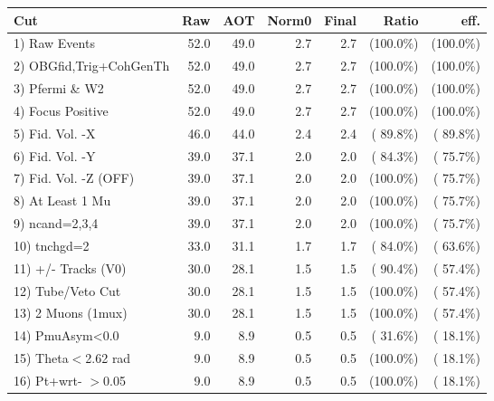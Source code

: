  \begin{table}[h!]\centering
 \begin{tabular}{||l||r|r|r|r|r|r||}
 \hline
 \hline
 Cut & Raw & AOT & Norm0 & Final & Ratio & eff.       \\
 \hline
  1) Raw Events           &         52.0 &         49.0 &          2.7 &          2.7 & (100.0\%) & (100.0\%) \\
  2) OBGfid,Trig+CohGenTh &         52.0 &         49.0 &          2.7 &          2.7 & (100.0\%) & (100.0\%) \\
  3) Pfermi \& W2         &         52.0 &         49.0 &          2.7 &          2.7 & (100.0\%) & (100.0\%) \\
  4) Focus Positive       &         52.0 &         49.0 &          2.7 &          2.7 & (100.0\%) & (100.0\%) \\
  5) Fid. Vol. -X         &         46.0 &         44.0 &          2.4 &          2.4 & ( 89.8\%) & ( 89.8\%) \\
  6) Fid. Vol. -Y         &         39.0 &         37.1 &          2.0 &          2.0 & ( 84.3\%) & ( 75.7\%) \\
  7) Fid. Vol. -Z (OFF)   &         39.0 &         37.1 &          2.0 &          2.0 & (100.0\%) & ( 75.7\%) \\
  8) At Least 1 Mu        &         39.0 &         37.1 &          2.0 &          2.0 & (100.0\%) & ( 75.7\%) \\
  9) ncand=2,3,4          &         39.0 &         37.1 &          2.0 &          2.0 & (100.0\%) & ( 75.7\%) \\
 10) tnchgd=2             &         33.0 &         31.1 &          1.7 &          1.7 & ( 84.0\%) & ( 63.6\%) \\
 11) +/- Tracks (V0)      &         30.0 &         28.1 &          1.5 &          1.5 & ( 90.4\%) & ( 57.4\%) \\
 12) Tube/Veto Cut        &         30.0 &         28.1 &          1.5 &          1.5 & (100.0\%) & ( 57.4\%) \\
 13) 2 Muons (1mux)       &         30.0 &         28.1 &          1.5 &          1.5 & (100.0\%) & ( 57.4\%) \\
 14) PmuAsym<0.0          &          9.0 &          8.9 &          0.5 &          0.5 & ( 31.6\%) & ( 18.1\%) \\
 15) Theta$<$2.62 rad     &          9.0 &          8.9 &          0.5 &          0.5 & (100.0\%) & ( 18.1\%) \\
 16) Pt+wrt- $>$0.05      &          9.0 &          8.9 &          0.5 &          0.5 & (100.0\%) & ( 18.1\%) \\

\end{tabular}
\end{table}
